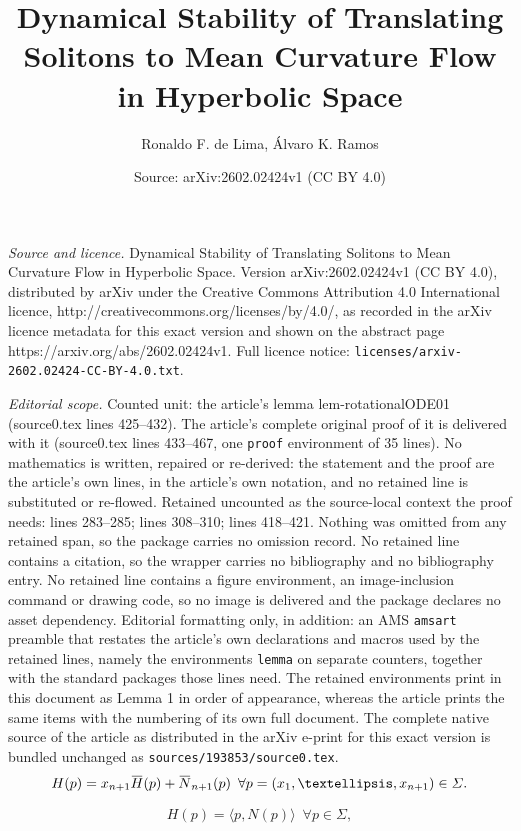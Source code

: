 \documentclass[10pt,a4paper]{amsart}
\title{Dynamical Stability of Translating Solitons to Mean Curvature Flow in Hyperbolic Space}
\author{Ronaldo F. de Lima, \'Alvaro K. Ramos}
\date{Source: arXiv:2602.02424v1 (CC BY 4.0)}
\renewcommand{\Sigma}{\varSigma}
\newcommand{\overbar}[1]{\mkern 1.5mu\overline{\mkern-1.5mu#1\mkern-1.5mu}\mkern 1.5mu}
\begin{document}
\maketitle

\noindent\emph{Source and licence.} Dynamical Stability of Translating Solitons to Mean Curvature Flow in Hyperbolic Space. Version arXiv:2602.02424v1 (CC BY 4.0), distributed by arXiv under the Creative Commons Attribution 4.0 International licence, http://creativecommons.org/licenses/by/4.0/, as recorded in the arXiv licence metadata for this exact version and shown on the abstract page https://arxiv.org/abs/2602.02424v1. Full licence notice: \texttt{licenses/arxiv-2602.02424-CC-BY-4.0.txt}.\par\smallskip

\noindent\textit{Editorial scope.} Counted unit: the article's lemma lem-rotationalODE01 (source0.tex lines 425--432). The article's complete original proof of it is delivered with it (source0.tex lines 433--467, one \texttt{proof} environment of 35 lines). No mathematics is written, repaired or re-derived: the statement and the proof are the article's own lines, in the article's own notation, and no retained line is substituted or re-flowed.  Retained uncounted as the source-local context the proof needs: lines 283--285; lines 308--310; lines 418--421.  Nothing was omitted from any retained span, so the package carries no omission record.  No retained line contains a citation, so the wrapper carries no bibliography and no bibliography entry.  No retained line contains a figure environment, an image-inclusion command or drawing code, so no image is delivered and the package declares no asset dependency.  Editorial formatting only, in addition: an AMS \texttt{amsart} preamble that restates the article's own declarations and macros used by the retained lines, namely the environments \texttt{lemma} on separate counters, together with the standard packages those lines need.  The retained environments print in this document as Lemma 1 in order of appearance, whereas the article prints the same items with the numbering of its own full document.  The complete native source of the article as distributed in the arXiv e-print for this exact version is bundled unchanged as \texttt{sources/193853/source0.tex}.
\begin{equation} \label{eq-MCrelation}
H(p)=x_{n+1}\overbar H(p)+\overbar N_{n+1}(p) \,\,\, \forall p=(x_1,\dots, x_{n+1})\in\Sigma.
\end{equation}

\begin{equation} \label{eq-translatorH301}
H(p)=\langle p,N(p)\rangle \,\,\,\forall p\in\Sigma,
\end{equation}
\end{document}
